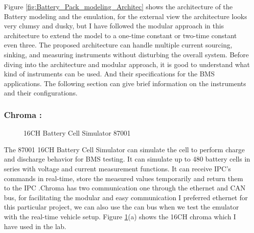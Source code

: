Figure \ref{fig:Battery_Pack_modeling_Architec} shows the architecture of the Battery modeling and the emulation, for the external view the architecture looks very clumsy and dusky, but I have followed the modular approach in this architecture to extend the model to a one-time constant or two-time constant even three. The proposed architecture can handle multiple current sourcing, sinking, and measuring instruments without disturbing the overall system. Before diving into the architecture and modular approach, it is good to understand what kind of instruments can be used. And their specifications for the BMS applications. The following section can give brief information on the instruments and their configurations.

\subsubsection{Chroma :}
\begin{figure}[h]
	\centering
    \qquad
	\caption{16CH Battery Cell Simulator 87001}
	\label{fig:Chroma}
\end{figure}
The 87001 16CH Battery Cell Simulator can simulate the cell to perform charge and discharge behavior for BMS testing. It can simulate up to 480 battery cells in series with voltage and current measurement functions. It can receive IPC's commands in real-time, store the measured values temporarily and return them to the IPC \cite{Chroma_UserManual}.Chroma has two communication one through the ethernet and CAN bus, for facilitating the modular and easy communication I preferred ethernet for this particular project, we can also use the can bus when we test the emulator with the real-time vehicle setup. Figure \ref{fig:Chroma}(a) shows the 16CH chroma which I have used in the lab.

